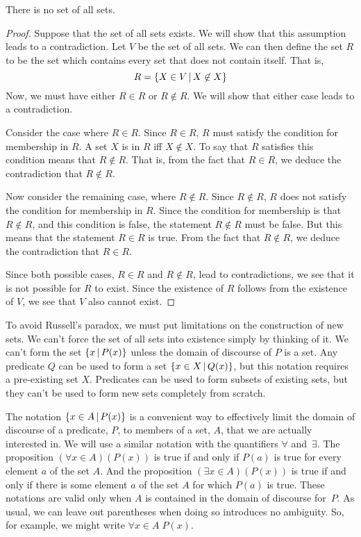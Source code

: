 \begin{theorem}\label{T-Russell}
There is no set of all sets.
\end{theorem}
\begin{proof}
Suppose that the set of all sets exists.  We will show that this
assumption leads to a contradiction.  Let $V$ be the set of all
sets.  We can then define the set $R$ to be the set which contains
every set that does not contain itself.  That is,
\[R=\{X\in V\,|\, X\not\in X\}\]
Now, we must have either $R\in R$ or $R\not\in R$.  We will show
that either case leads to a contradiction.

Consider the case where $R\in R$.  Since $R\in R$, $R$ must satisfy the
condition for membership in $R$.  A set $X$ is in $R$ iff $X\not\in X$.
To say that $R$ satisfies this condition means that $R\not\in R$.
That is, from the fact that $R\in R$, we deduce the contradiction
that $R\not\in R$.

Now consider the remaining case, where $R\not\in R$.  Since
$R\not\in R$, $R$ does not satisfy the condition for membership
in $R$.  Since the condition for membership is that $R\not\in R$,
and this condition is false,
the statement $R\not\in R$ must be false.
But this means that the statement $R\in R$ is true.  From the
fact that $R\not\in R$, we deduce the contradiction that $R\in R$.

Since both possible cases, $R\in R$ and $R\not\in R$, lead to contradictions,
we see that it is not possible for $R$ to exist.  Since the existence of
$R$ follows from the existence of $V$, we see that $V$ also cannot
exist.
\end{proof}

To avoid Russell's paradox, we must put limitations on the construction
of new sets.  We can't force the set of all sets into existence
simply by thinking of it.  We can't form the set $\{x\,|\, P(x)\}$
unless the domain of discourse of $P$ is a set.  Any predicate $Q$
can be used to form a set $\{x\in X\,|\, Q(x)\}$, but this notation
requires a pre-existing set $X$.
Predicates can be used to form subsets of existing sets, but they
can't be used to form new sets completely from scratch.

\medskip

The notation $\{x\in A\,|\, P(x)\}$ is a convenient way to effectively limit
the domain of discourse of a predicate, $P$, to members of a set, $A$, that
we are actually interested in.  We will use a similar notation with the
quantifiers $\forall$ and~$\exists$.  The proposition $(\forall x\in A)(P(x))$
is true if and only if $P(a)$ is true for every element $a$ of the set $A$.
And the proposition $(\exists x\in A)(P(x))$ is true if and only if there
is some element $a$ of the set $A$ for which $P(a)$ is true.  These notations
are valid only when $A$ is contained in the domain of discourse for~$P$.
As usual, we can leave out parentheses when doing so introduces no
ambiguity.  So, for example, we might write $\forall x\in A\;P(x)$.

